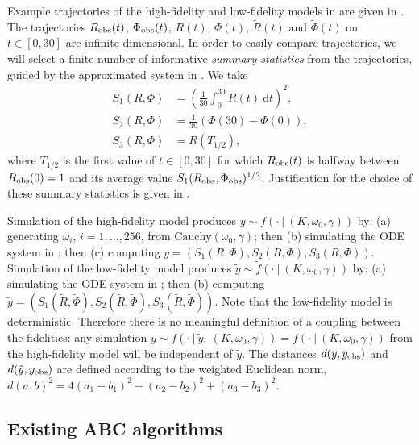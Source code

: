 \documentclass[review]{siamonline190516}
\begin{document}
Example trajectories of the high-fidelity and low-fidelity models in  are given in .
The trajectories $R_{\mathrm{obs}}(t)$, $\Phi_{\mathrm{obs}}(t)$, $R(t)$, $\Phi(t)$, $\tilde R(t)$ and $\tilde \Phi(t)$ on $t \in [0,30]$ are infinite dimensional.
In order to easily compare trajectories, we will select a finite number of informative \emph{summary statistics} from the trajectories, guided by the approximated system in .
We take
\begin{align*}
S_1(R, \Phi) &= \left( \frac{1}{30} \int_0^{30} R(t) ~\mathrm dt \right)^2, \\
S_2(R, \Phi) &= \frac{1}{30} \left( \Phi(30) - \Phi(0) \right), \\
S_3(R, \Phi) &= R \left( T_{1/2} \right),
\end{align*}
where $T_{1/2}$ is the first value of $t \in [0,30]$ for which $R_{\mathrm{obs}}(t)$ is halfway between $R_{\mathrm{obs}}(0)=1$ and its average value $S_1(R_{\mathrm{obs}}, \Phi_{\mathrm{obs}})^{1/2}$.
Justification for the choice of these summary statistics is given in .

Simulation of the high-fidelity model produces $y \sim f(\cdot~|~(K, \omega_0, \gamma))$ by: 
(a) generating $\omega_i$, $i=1,\dots,256$, from $\mathrm{Cauchy}(\omega_0, \gamma)$; then 
(b) simulating the ODE system in ; then 
(c) computing $y = (S_1(R, \Phi), S_2(R, \Phi), S_3(R, \Phi))$.
Simulation of the low-fidelity model produces $\tilde y \sim \tilde f(\cdot~|~(K, \omega_0, \gamma))$ by: 
(a) simulating the ODE system in ; then
(b) computing $\tilde y = (S_1(\tilde R, \tilde \Phi), S_2(\tilde R, \tilde \Phi), S_3(\tilde R, \tilde \Phi))$.
Note that the low-fidelity model is deterministic.
Therefore there is no meaningful definition of a coupling between the fidelities: any simulation $y \sim f(\cdot~|~\tilde y,~(K, \omega_0, \gamma)) = f(\cdot~|~(K, \omega_0, \gamma))$ from the high-fidelity model will be independent of $\tilde y$.
The distances $d(y, y_{\mathrm{obs}})$ and $d(\tilde y, y_{\mathrm{obs}})$ are defined according to the weighted Euclidean norm, $d(a,b)^2 = 4(a_1 - b_1)^2 + (a_2 - b_2)^2 + (a_3 - b_3)^2$.

\subsection{Existing ABC algorithms}
\label{s:existing}
\end{document}
